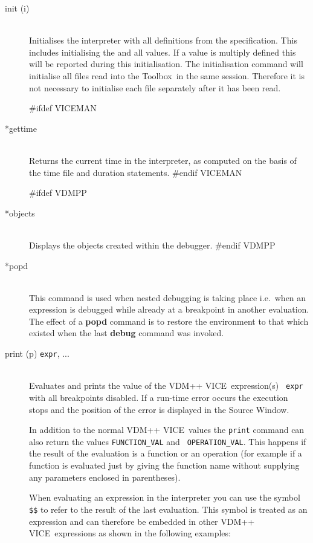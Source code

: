 \documentclass[\pformat,12pt]{article}
\newcommand{\vdmslpp}{VDM-SL}
\newcommand{\Toolbox}{Toolbox}
\newcommand{\vdmslpp}{VDM++}
\newcommand{\Toolbox}{Toolbox}
\renewcommand{\vdmslpp}{VDM++ VICE}
\newcommand{\guicmd}[1]{{\sf #1}}
\newcommand{\guicmd}[1]{{\gt #1}}
\begin{document}
\begin{description}
\item[init (i)] \mbox{}\\ Initialises
  the interpreter with all definitions from the specification. This
  includes initialising the
   and all
  values. If a value is multiply defined this will be reported during
  this initialisation. The initialisation command will initialise all
  files read into the \Toolbox\ in the same session. Therefore it is
  not necessary to initialise each file separately after it has been
  read.
  
#ifdef VICEMAN
\item[*gettime]\mbox{}\\
  Returns the current time in the interpreter, as computed 
  on the basis of the time file and duration statements.
#endif VICEMAN

#ifdef VDMPP
\item[*objects] \mbox{}\\
  Displays the objects created within the debugger.
#endif VDMPP

\item[*popd] \mbox{}\\
  This command is used when nested debugging is taking place i.e.\ when
  an expression is debugged while already at a breakpoint in another
  evaluation. The effect of a 
  \textbf{popd} command is to restore the environment to that which
  existed when the last \textbf{debug} command was invoked.

\item[print (p) {\tt expr}, ...] \mbox{}\\
  Evaluates and prints the value of the \vdmslpp\ expression(s) {\tt
    expr} with all breakpoints disabled. If a run-time error occurs
  the execution stops and the position of the error is
  displayed in the \guicmd{Source Window}.
  
  In addition to the normal \vdmslpp\ values the {\tt print} command
  can also return the values {\tt FUNCTION\_VAL} and {\tt
    OPERATION\_VAL}\@.  This happens if the result of the evaluation is
  a function or an operation (for example if a function
  is evaluated just by giving the function name without supplying any
  parameters enclosed in parentheses).
  
  When evaluating an expression in the interpreter you can use the 
  symbol {\tt \$\$}\index{\$\$} to refer to the result of the last
  evaluation. This symbol is treated as an expression and can
  therefore be embedded in other \vdmslpp\ expressions as shown in
  the following examples:


\end{description}
\end{document}
